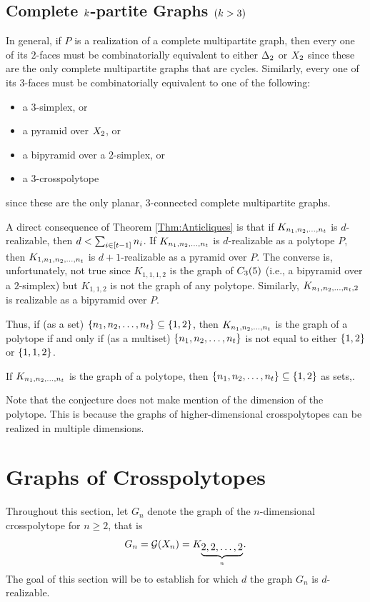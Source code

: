     \subsection{Complete \protect$k\protect$-partite Graphs \protect$(k>3)\protect$}
    In general, if \(P\) is a realization of a complete multipartite graph, then every one of its \(2\)-faces must be combinatorially equivalent to either \(\simp2\) or \(\xp2\) since these are the only complete multipartite graphs that are cycles.  Similarly, every one of its \(3\)-faces must be combinatorially equivalent to one of the following:
        \begin{itemize}
            \item   a \(3\)-simplex, or
            \item   a pyramid over \(\xp2\), or
            \item   a bipyramid over a \(2\)-simplex, or
            \item   a \(3\)-crosspolytope
        \end{itemize}
    since these are the only planar, \(3\)-connected complete multipartite graphs.

    A direct consequence of Theorem \ref{Thm:Anticliques} is that if \(K_{n_1,n_2\dc n_t}\) is \(d\)-realizable, then \(d<\sum_{i\in\brac{t-1}}n_i\).  If \(K_{n_1,n_2\dc n_t}\) is \(d\)-realizable as a polytope \(P\), then \(K_{1,n_1,n_2\dc n_t}\) is \(d+1\)-realizable as a pyramid over \(P\).  The converse is, unfortunately, not true since \(K_{1,1,1,2}\) is the graph of \(\cyc53\) (i.{}e.{}, a bipyramid over a \(2\)-simplex) but \(K_{1,1,2}\) is not the graph of any polytope.  Similarly, \(K_{n_1,n_2\dc n_t,2}\) is realizable as a bipyramid over \(P\).

    Thus, if (as a set) \(\seta{n_1,n_2\dc n_t}\sbset\seta{1,2}\), then \(K_{n_1,n_2\dc n_t}\) is the graph of a polytope if and only if (as a multiset) \(\seta{n_1,n_2\dc n_t}\) is not equal to either \(\seta{1,2}\) or \(\seta{1,1,2}\).

    \begin{Conjecture}
        If \(K_{n_1,n_2\dc n_t}\) is the graph of a polytope, then \(\seta{n_1,n_2\dc n_t}\sbset\seta{1,2}\) as sets,.
    \end{Conjecture}

    Note that the conjecture does not make mention of the dimension of the polytope.  This is because the graphs of higher-dimensional crosspolytopes can be realized in multiple dimensions.

\section{Graphs of Crosspolytopes}
    Throughout this section, let \(G_n\) denote the graph of the \(n\)-dimensional crosspolytope for \(n\ge 2\), that is
        \[
            G_n
                =   \gr{X_n}
                =   K_{\underbrace{2,2\dc2}_n}.
        \]
    The goal of this section will be to establish for which \(d\) the graph \(G_n\) is \(d\)-realizable.

